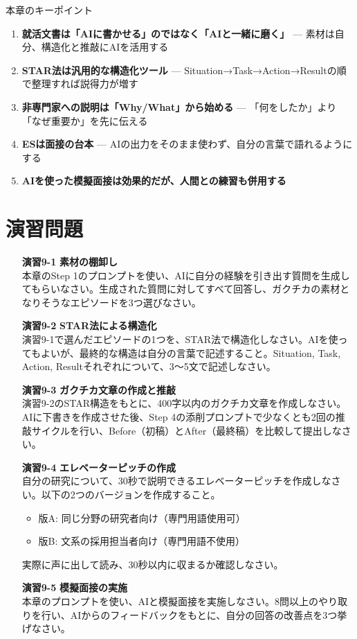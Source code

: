 \vspace{5mm}
\begin{itembox}[l]{本章のキーポイント}
\begin{enumerate}
\item \textbf{就活文書は「AIに書かせる」のではなく「AIと一緒に磨く」} --- 素材は自分、構造化と推敲にAIを活用する
\item \textbf{STAR法は汎用的な構造化ツール} --- Situation→Task→Action→Resultの順で整理すれば説得力が増す
\item \textbf{非専門家への説明は「Why/What」から始める} --- 「何をしたか」より「なぜ重要か」を先に伝える
\item \textbf{ESは面接の台本} --- AIの出力をそのまま使わず、自分の言葉で語れるようにする
\item \textbf{AIを使った模擬面接は効果的だが、人間との練習も併用する}
\end{enumerate}
\end{itembox}

\section*{演習問題}

\begin{enumerate}
\item[\textbf{演習9-1}] \textbf{素材の棚卸し}\\
本章のStep 1のプロンプトを使い、AIに自分の経験を引き出す質問を生成してもらいなさい。生成された質問に対してすべて回答し、ガクチカの素材となりそうなエピソードを3つ選びなさい。

\item[\textbf{演習9-2}] \textbf{STAR法による構造化}\\
演習9-1で選んだエピソードの1つを、STAR法で構造化しなさい。AIを使ってもよいが、最終的な構造は自分の言葉で記述すること。Situation, Task, Action, Resultそれぞれについて、3〜5文で記述しなさい。

\item[\textbf{演習9-3}] \textbf{ガクチカ文章の作成と推敲}\\
演習9-2のSTAR構造をもとに、400字以内のガクチカ文章を作成しなさい。AIに下書きを作成させた後、Step 4の添削プロンプトで少なくとも2回の推敲サイクルを行い、Before（初稿）とAfter（最終稿）を比較して提出しなさい。

\item[\textbf{演習9-4}] \textbf{エレベーターピッチの作成}\\
自分の研究について、30秒で説明できるエレベーターピッチを作成しなさい。以下の2つのバージョンを作成すること。
\begin{itemize}
\item 版A: 同じ分野の研究者向け（専門用語使用可）
\item 版B: 文系の採用担当者向け（専門用語不使用）
\end{itemize}
実際に声に出して読み、30秒以内に収まるか確認しなさい。

\item[\textbf{演習9-5}] \textbf{模擬面接の実施}\\
本章のプロンプトを使い、AIと模擬面接を実施しなさい。8問以上のやり取りを行い、AIからのフィードバックをもとに、自分の回答の改善点を3つ挙げなさい。
\end{enumerate}
